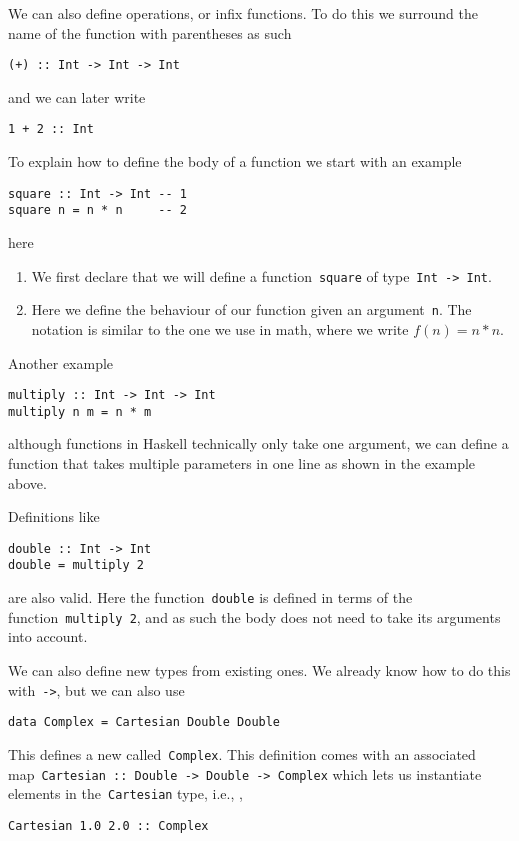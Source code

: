 \documentclass[a4paper]{article}
\theoremstyle{plain}
\theoremstyle{definition}
\newcommand{\ie}{{i}.{e}., }
\begin{document}
We can also define operations, or infix functions. To do this we surround the
name of the function with parentheses as such
\begin{verbatim}
(+) :: Int -> Int -> Int
\end{verbatim}
and we can later write
\begin{verbatim}
1 + 2 :: Int
\end{verbatim}

To explain how to define the body of a function we start with an example
\begin{verbatim}
square :: Int -> Int -- 1
square n = n * n     -- 2
\end{verbatim}
here
\begin{enumerate}
    \item We first declare that we will define a
        function~\texttt{square} of
        type~\texttt{Int -> Int}.
    \item Here we define the behaviour of our function given an
        argument~\texttt{n}. The notation is similar to the one
        we use in math, where we write \(f(n) = n*n\).
\end{enumerate}
Another example
\begin{verbatim}
multiply :: Int -> Int -> Int
multiply n m = n * m
\end{verbatim}
although functions in Haskell technically only take one argument, we can define
a function that takes multiple parameters in one line as shown in the example
above.

Definitions like
\begin{verbatim}
double :: Int -> Int
double = multiply 2
\end{verbatim}
are also valid. Here the function~\texttt{double} is defined in
terms of the function~\texttt{multiply 2}, and as such the body
does not need to take its arguments into account.

We can also define new types from existing ones. We already know how to do this
with~\texttt{->}, but we can also use
\begin{verbatim}
data Complex = Cartesian Double Double
\end{verbatim}
This defines a new called~\texttt{Complex}. This definition comes
with an associated
map~\texttt{Cartesian :: Double -> Double -> Complex} which lets us
instantiate elements in the~\texttt{Cartesian} type, \ie,
\begin{verbatim}
Cartesian 1.0 2.0 :: Complex
\end{verbatim}
\end{document}
